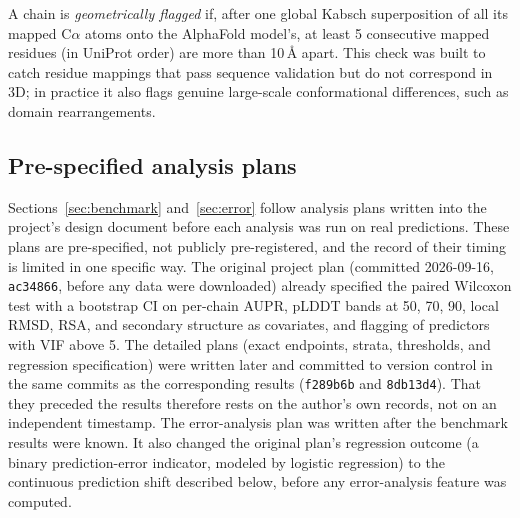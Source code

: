 \documentclass[10pt]{article}
\begin{document}
A chain is \emph{geometrically flagged} if, after one global Kabsch
superposition of all its mapped C$\alpha$ atoms onto the AlphaFold model's,
at least 5 consecutive mapped residues (in UniProt order) are more
than 10\,\r{A} apart. This check was built to catch residue
mappings that pass sequence validation but do not correspond in 3D; in
practice it also flags genuine large-scale conformational differences, such
as domain rearrangements.

\subsection{Pre-specified analysis plans}
\label{sec:prespec}

Sections~\ref{sec:benchmark} and~\ref{sec:error} follow analysis plans
written into the project's design document before each analysis was run on
real predictions. These plans are pre-specified, not publicly pre-registered,
and the record of their timing is limited in one specific way. The original
project plan (committed 2026-09-16, \texttt{ac34866}, before any data were
downloaded) already specified the paired Wilcoxon test with a bootstrap CI on
per-chain AUPR, pLDDT bands at 50, 70, 90, local RMSD, RSA, and
secondary structure as covariates, and flagging of predictors with VIF above
5. The detailed plans (exact endpoints, strata, thresholds,
and regression specification) were written later and committed to version
control in the same commits as the corresponding results (\texttt{f289b6b}
and \texttt{8db13d4}). That they preceded the results therefore rests on the
author's own records, not on an independent timestamp. The error-analysis
plan was written after the benchmark results were known. It also changed the
original plan's regression outcome (a binary prediction-error indicator,
modeled by logistic regression) to the continuous prediction shift described
below, before any error-analysis feature was computed.
\end{document}
